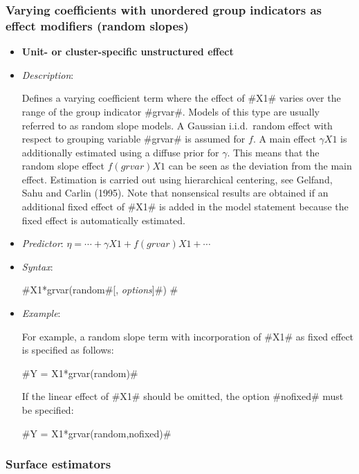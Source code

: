 

\subsubsection*{Varying coefficients with unordered group indicators as effect modifiers
(random slopes)}

\begin{itemize}
\item[]{\bf\sffamily Unit- or cluster-specific unstructured
effect}

\item[] {\em Description}:

Defines a varying coefficient term where the effect of #X1# varies
over the range of the group indicator #grvar#. Models of this type
are usually referred to as random slope models. A  Gaussian
i.i.d.~random effect with respect to grouping variable #grvar# is
assumed for $f$. A main effect $\gamma X1$ is additionally
estimated using a diffuse prior for $\gamma$. This means that the
random slope effect $f(grvar)X1$ can be seen as the deviation from
the main effect. Estimation is carried out using hierarchical
centering, see Gelfand, Sahu and Carlin (1995). Note that
nonsensical results are obtained if an additional fixed effect of
#X1# is added in the model statement because the fixed effect is
automatically estimated.
\item[] {\em Predictor}: $\eta = \cdots + \gamma X1 + f(grvar)X1 + \cdots$
\item[] {\em Syntax}:

#X1*grvar(random#[, {\em options}]#) #
\item[] {\em Example}:

For example, a random slope term with incorporation of #X1# as
fixed effect is specified as follows:

#Y = X1*grvar(random)#

If the linear effect of #X1# should be omitted, the option
#nofixed# must be specified:

#Y = X1*grvar(random,nofixed)#
\end{itemize}


\subsubsection*{Surface estimators}

